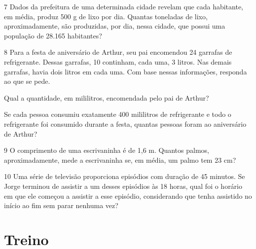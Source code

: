 \num{7} Dados da prefeitura de uma determinada cidade revelam que cada
habitante, em média, produz 500 g de lixo por dia. Quantas toneladas de lixo,
aproximadamente, são produzidas, por dia, nessa cidade, que
possui uma população de 28.165 habitantes?



\num{8} Para a festa de aniversário de Arthur, seu pai encomendou 24
garrafas de refrigerante. Dessas garrafas, 10 continham, cada uma, 3
litros. Nas demais garrafas, havia dois litros em cada uma. Com base
nessas informações, responda ao que se pede.

\begin{escolha}
\item
  Qual a quantidade, em mililitros, encomendada pelo pai de Arthur?


\item
  Se cada pessoa consumiu exatamente 400 mililitros de refrigerante e
  todo o refrigerante foi consumido durante a festa, quantas pessoas
  foram ao aniversário de Arthur?

\end{escolha}


\num{9} O comprimento de uma escrivaninha é de 1,6 m. Quantos palmos,
aproximadamente, mede a escrivaninha se, em média, um palmo tem 23 cm?


\num{10} Uma série de televisão proporciona episódios com duração de 45
minutos. Se Jorge terminou de assistir a um desses episódios às 18 horas, qual
foi o horário em que ele começou a assistir a esse episódio, considerando que tenha assistido
no início ao fim sem parar nenhuma vez?



\section{Treino}

